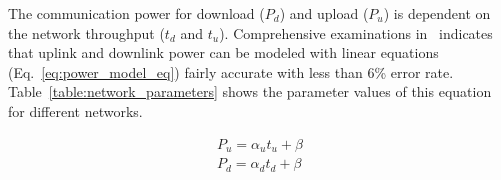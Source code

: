 The communication power for download ($P_d$) and upload ($P_u$) is dependent on the network throughput ($t_d$ and $t_u$). Comprehensive examinations in~\cite{4GLTE} indicates that uplink and downlink power can be modeled with linear equations (Eq.~\ref{eq:power_model_eq}) fairly accurate with less than 6\% error rate. Table~\ref{table:network_parameters} shows the parameter values of this equation for different networks. 

\begin{equation}
\begin{split}
P_u = \alpha_u t_u + \beta \\
P_d = \alpha_d t_d + \beta \label{eq:power_model_eq}
  \end{split}
\end{equation}


